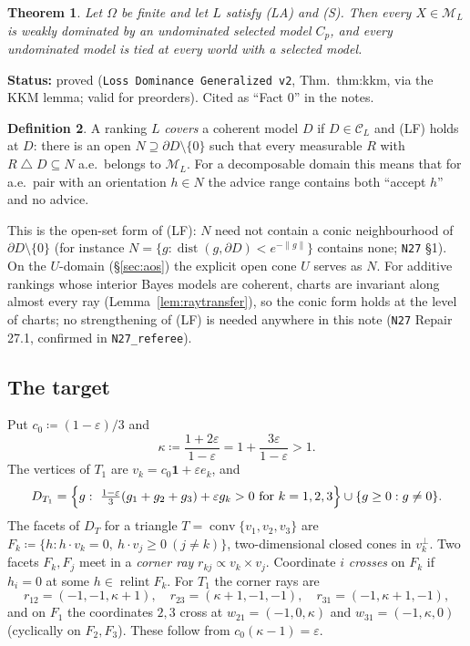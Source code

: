 \documentclass[11pt]{article}
\newtheorem{theorem}{Theorem}[section]
\theoremstyle{definition}
\newtheorem{definition}[theorem]{Definition}
\theoremstyle{remark}
\newcommand{\one}{\mathbf 1}
\newcommand{\M}{\mathcal M}
\newcommand{\C}{\mathcal C}
\newcommand{\co}{\operatorname{conv}}
\newcommand{\relint}{\operatorname{relint}}
\newcommand{\sd}{\mathbin{\triangle}}
\newcommand{\src}[1]{\texttt{#1}}
\newcommand{\status}[1]{\par\smallskip\noindent\textbf{Status:} #1\par\smallskip}
\begin{document}
\begin{theorem}\label{thm:kkm}
Let $\Omega$ be finite and let $L$ satisfy (LA) and (S). Then every $X\in\M_L$ is weakly dominated by an undominated selected model $C_p$, and every undominated model is tied at every world with a selected model.
\end{theorem}
\status{proved (\src{Loss Dominance Generalized v2}, Thm.~thm:kkm, via the KKM lemma; valid for preorders). Cited as ``Fact 0'' in the notes.}

\begin{definition}\label{def:LF}
A ranking $L$ \emph{covers} a coherent model $D$ if $D\in\C_L$ and (LF) holds at $D$: there is an open $N\supseteq\partial D\setminus\{0\}$ such that every measurable $R$ with $R\sd D\subseteq N$ a.e.\ belongs to $\M_L$. For a decomposable domain this means that for a.e.\ pair with an orientation $h\in N$ the advice range contains both ``accept $h$'' and no advice.
\end{definition}
This is the open-set form of (LF): $N$ need not contain a conic neighbourhood of $\partial D\setminus\{0\}$ (for instance $N=\{g:\operatorname{dist}(g,\partial D)<e^{-\|g\|}\}$ contains none; \src{N27} \S1). On the $U$-domain (\S\ref{sec:aos}) the explicit open cone $U$ serves as $N$. For additive rankings whose interior Bayes models are coherent, charts are invariant along almost every ray (Lemma~\ref{lem:raytransfer}), so the conic form holds at the level of charts; no strengthening of (LF) is needed anywhere in this note (\src{N27} Repair 27.1, confirmed in \src{N27\_referee}).

\subsection{The target}
Put $c_0\coloneqq(1-\varepsilon)/3$ and
\[
\kappa\coloneqq\frac{1+2\varepsilon}{1-\varepsilon}=1+\frac{3\varepsilon}{1-\varepsilon}>1 .
\]
The vertices of $T_1$ are $v_k=c_0\one+\varepsilon e_k$, and
\[
D_{T_1}=\Bigl\{g:\ \tfrac{1-\varepsilon}3(g_1+g_2+g_3)+\varepsilon g_k>0\ \text{for }k=1,2,3\Bigr\}\cup\{g\ge0:g\ne0\}.
\]
The facets of $D_{T}$ for a triangle $T=\co\{v_1,v_2,v_3\}$ are $F_k\coloneqq\{h:h\cdot v_k=0,\ h\cdot v_j\ge0\ (j\ne k)\}$, two-dimensional closed cones in $v_k^\perp$. Two facets $F_k,F_j$ meet in a \emph{corner ray} $r_{kj}\propto v_k\times v_j$. Coordinate $i$ \emph{crosses} on $F_k$ if $h_i=0$ at some $h\in\relint F_k$. For $T_1$ the corner rays are
\[
r_{12}=(-1,-1,\kappa+1),\quad r_{23}=(\kappa+1,-1,-1),\quad r_{31}=(-1,\kappa+1,-1),
\]
and on $F_1$ the coordinates $2,3$ cross at $w_{21}=(-1,0,\kappa)$ and $w_{31}=(-1,\kappa,0)$ (cyclically on $F_2,F_3$). These follow from $c_0(\kappa-1)=\varepsilon$.
\end{document}
